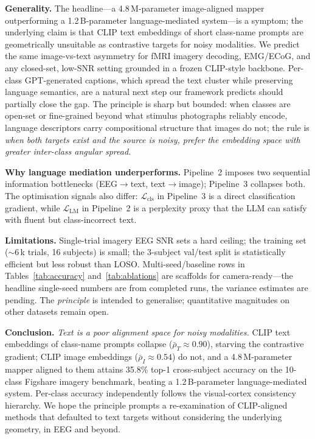 \documentclass{article}
\begin{document}
\textbf{Generality.} The headline---a 4.8\,M-parameter image-aligned mapper outperforming a 1.2\,B-parameter language-mediated system---is a symptom; the underlying claim is that CLIP text embeddings of short class-name prompts are geometrically unsuitable as contrastive targets for noisy modalities. We predict the same image-vs-text asymmetry for fMRI imagery decoding, EMG/ECoG, and any closed-set, low-SNR setting grounded in a frozen CLIP-style backbone. Per-class GPT-generated captions, which spread the text cluster while preserving language semantics, are a natural next step our framework predicts should partially close the gap. The principle is sharp but bounded: when classes are open-set or fine-grained beyond what stimulus photographs reliably encode, language descriptors carry compositional structure that images do not; the rule is \emph{when both targets exist and the source is noisy, prefer the embedding space with greater inter-class angular spread.}

\textbf{Why language mediation underperforms.} Pipeline~2 imposes two sequential information bottlenecks (EEG$\to$text, text$\to$image); Pipeline~3 collapses both. The optimisation signals also differ: $\mathcal{L}_\mathrm{cls}$ in Pipeline~3 is a direct classification gradient, while $\mathcal{L}_\mathrm{LM}$ in Pipeline~2 is a perplexity proxy that the LLM can satisfy with fluent but class-incorrect text.

\textbf{Limitations.} Single-trial imagery EEG SNR sets a hard ceiling; the training set ($\sim$6\,k trials, 16 subjects) is small; the 3-subject val/test split is statistically efficient but less robust than LOSO. Multi-seed/baseline rows in Tables~\ref{tab:accuracy} and~\ref{tab:ablations} are scaffolds for camera-ready---the headline single-seed numbers are from completed runs, the variance estimates are pending. The \emph{principle} is intended to generalise; quantitative magnitudes on other datasets remain open.

\textbf{Conclusion.} \emph{Text is a poor alignment space for noisy modalities.} CLIP text embeddings of class-name prompts collapse ($\bar{\rho}_T{\approx}0.90$), starving the contrastive gradient; CLIP image embeddings ($\bar{\rho}_I{\approx}0.54$) do not, and a 4.8\,M-parameter mapper aligned to them attains 35.8\% top-1 cross-subject accuracy on the 10-class Figshare imagery benchmark, beating a 1.2\,B-parameter language-mediated system. Per-class accuracy independently follows the visual-cortex consistency hierarchy. We hope the principle prompts a re-examination of CLIP-aligned methods that defaulted to text targets without considering the underlying geometry, in EEG and beyond.
\end{document}
